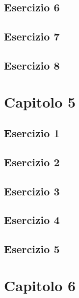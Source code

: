 \documentclass[a4paper,12pt,oneside]{book}
\begin{document}
\hypertarget{esercizio-6}{%
\subsection{Esercizio 6}\label{esercizio-6}}

\hypertarget{esercizio-7}{%
\subsection{Esercizio 7}\label{esercizio-7}}

\hypertarget{esercizio-8}{%
\subsection{Esercizio 8}\label{esercizio-8}}

\hypertarget{capitolo-5}{%
\section{Capitolo 5}\label{capitolo-5}}

\hypertarget{esercizio-1-3}{%
\subsection{Esercizio 1}\label{esercizio-1-3}}

\hypertarget{esercizio-2-2}{%
\subsection{Esercizio 2}\label{esercizio-2-2}}

\hypertarget{esercizio-3-2}{%
\subsection{Esercizio 3}\label{esercizio-3-2}}

\hypertarget{esercizio-4-1}{%
\subsection{Esercizio 4}\label{esercizio-4-1}}

\hypertarget{esercizio-5-1}{%
\subsection{Esercizio 5}\label{esercizio-5-1}}

\hypertarget{capitolo-6}{%
\section{Capitolo 6}\label{capitolo-6}}
\end{document}
